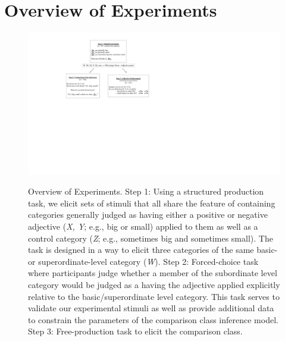 \documentclass[doc]{apa6}
\begin{document}
\section{Overview of Experiments}

\begin{figure}[htb]
{\centering \includegraphics[width=1\textwidth]{figs/expt_overview} }
\caption{\small Overview of Experiments. Step 1: Using a structured production task, we elicit sets of stimuli that all share the feature of containing categories generally judged as having either a positive or negative adjective  (\emph{X, Y}; e.g., big or small) applied to them as well as a control category (\emph{Z}; e.g., sometimes big and sometimes small). The task is designed in a way to elicit three categories of the same basic- or superordinate-level category (\emph{W}). Step 2: Forced-choice task where participants judge whether a member of the subordinate level category would be judged as a having the adjective applied explicitly relative to the basic/superordinate level category. This task serves to validate our experimental stimuli as well as provide additional data to constrain the parameters of the comparison class inference model. Step 3: Free-production task to elicit the comparison class.}\label{fig:exptOverview}
\end{figure}
\end{document}
